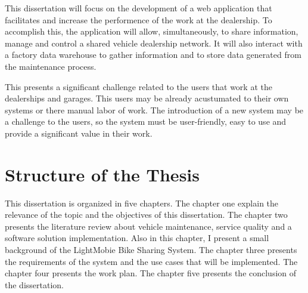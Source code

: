 This dissertation will focus on the development of a web application that facilitates and increase the performence of the work at the dealership.
To accomplish this, the application will allow, simultaneously, to share information, manage and control a shared vehicle dealership network.
It will also interact with a factory data warehouse to gather information and to store data generated from the maintenance process. 

This presents a significant challenge related to the users that work at the dealerships and garages. 
This users may be already acustumated to their own systems or there manual labor of work.  
The introduction of a new system may be a challenge to the users, so the system must be user-friendly, easy to use and provide a significant value in their work.

\section{Structure of the Thesis}

This dissertation is organized in five chapters. The chapter one explain the relevance of the topic and the objectives of this dissertation.
The chapter two presents the literature review about vehicle maintenance, service quality and a software solution implementation. 
Also in this chapter, I present a small background of the LightMobie Bike Sharing System.
The chapter three presents the requirements of the system and the use cases that will be implemented.
The chapter four presents the work plan.
The chapter five presents the conclusion of the dissertation.

